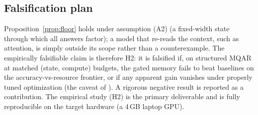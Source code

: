 \subsection{Falsification plan}
Proposition~\ref{prop:floor} holds under assumption (A2) (a fixed-width state through which all
answers factor); a model that re-reads the context, such as attention, is simply outside its
scope rather than a counterexample. The empirically falsifiable claim is therefore H2: it is
falsified if, on structured MQAR at matched (state, compute) budgets, the gated memory fails to
beat baselines on the accuracy-vs-resource frontier, or if any apparent gain vanishes under
properly tuned optimization (the caveat of \citet{okpekpe2025revisiting}). A rigorous negative
result is reported as a contribution. The empirical study (H2) is the primary deliverable and is
fully reproducible on the target hardware (a 4\,GB laptop GPU).
